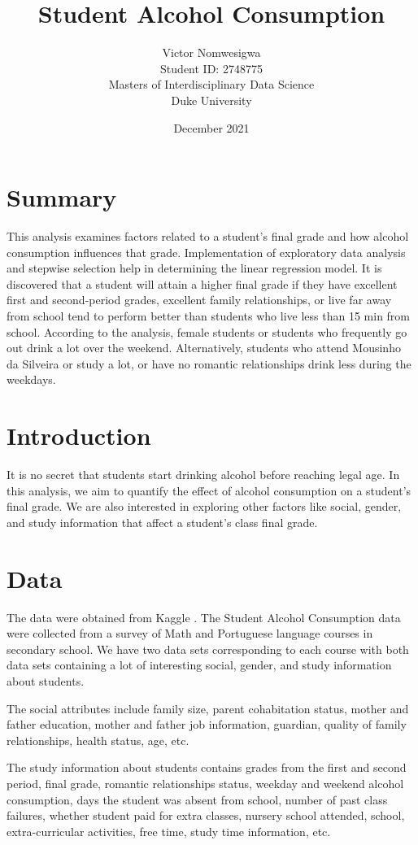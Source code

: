 \documentclass[11pt]{article}
\title{Student Alcohol Consumption}
\author{Victor Nomwesigwa\\
\AND
Student ID: 2748775\\
\AND
\AND
\AND
\AND
	Masters of Interdisciplinary Data Science\\
\AND
	Duke University\\
}
\date{December 2021}
\begin{document}
\maketitle



\newpage
\section{Summary}

This analysis examines factors related to a student's final grade and how alcohol consumption influences that grade. Implementation of exploratory data analysis and stepwise selection help in determining
the linear regression model. It is discovered that a student will attain a higher final grade if they have excellent first and second-period grades, excellent family relationships, or live far away from school tend to perform better than students who live less than 15 min from school. 
According to the analysis, female students or students who frequently go out drink a lot over the weekend. Alternatively, students who attend Mousinho da Silveira or study a lot, or have no romantic relationships drink less during the weekdays. 

\section{Introduction}
It is no secret that students start drinking alcohol before reaching legal age. In this analysis, we aim to quantify the effect of alcohol consumption on a student's final grade. We are also interested in exploring other factors like social, gender, and study information that affect a student's class final grade.

\section{Data}
The data were obtained from Kaggle \cite{Kaggle}. The Student Alcohol Consumption data were collected from a survey of Math and Portuguese language courses in secondary school. We have two data sets corresponding to each course with both data sets containing a lot of interesting social, gender, and study information about students. 

The social attributes include family size, parent cohabitation status, mother and father education, mother and father job information, guardian, quality of family relationships, health status, age, etc.

The study information about students contains grades from the first and second period, final grade, romantic relationships status, weekday and weekend alcohol consumption, days the student was absent from school, number of past class failures, whether student paid for extra classes, nursery school attended, school, extra-curricular activities, free time, study time information, etc.
\end{document}
